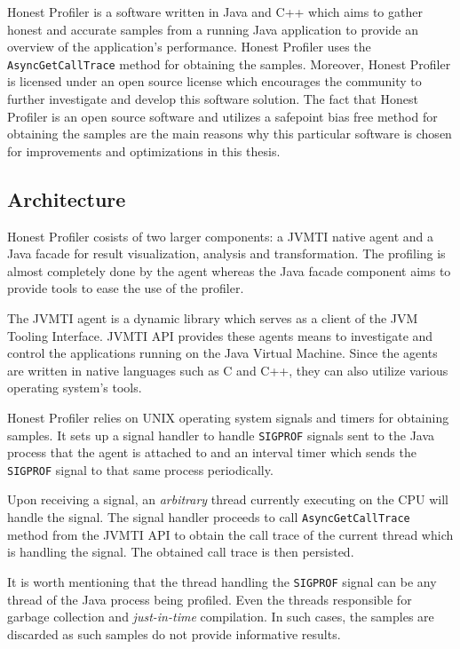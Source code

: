 \documentclass[..thesis.tex]{subfiles}
\begin{document}
Honest Profiler \cite{hon_prof} is a software written in Java and C++ which aims to gather honest and accurate samples from a running Java application to provide an overview of the application's performance. Honest Profiler uses the \texttt{Async\-Get\-Call\-Trace} method for obtaining the samples. Moreover, Honest Profiler is licensed under an open source license which encourages the community to further investigate and develop this software solution. The fact that Honest Profiler is an open source software and utilizes a safepoint bias free method for obtaining the samples are the main reasons why this particular software is chosen for improvements and optimizations in this thesis.

\subsection{Architecture}
Honest Profiler cosists of two larger components: a JVMTI native agent and a Java facade for result visualization, analysis and transformation. The profiling is almost completely done by the agent whereas the Java facade component aims to provide tools to ease the use of the profiler.

The JVMTI agent is a dynamic library which serves as a client of the JVM Tooling Interface. \cite{jvmtm} JVMTI API provides these agents means to investigate and control the applications running on the Java Virtual Machine. Since the agents are written in native languages such as C and C++, they can also utilize various operating system's tools.

Honest Profiler relies on UNIX operating system signals and timers for obtaining samples.
It sets up a signal handler to handle \texttt{SIGPROF} signals sent to the Java process that the agent is attached to and an interval timer which sends the \texttt{SIGPROF} signal to that same process periodically. 

Upon receiving a signal, an \textit{arbitrary} thread currently executing on the CPU will handle the signal. \cite{stevens_advanced_2013} The signal handler proceeds to call \texttt{AsyncGetCallTrace} method from the JVMTI API to obtain the call trace of the current thread which is handling the signal. The obtained call trace is then persisted.

It is worth mentioning that the thread handling the \texttt{SIGPROF} signal can be any thread of the Java process being profiled. Even the threads responsible for garbage collection and \textit{just-in-time} compilation. In such cases, the samples are discarded as such samples do not provide informative results.
\end{document}
